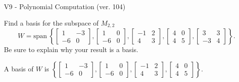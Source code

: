 \begin{exercise}
  \begin{exerciseTitle}V9 - Polynomial Computation (ver. 104)\end{exerciseTitle}
  \begin{exerciseStatement}
    Find a basis for the subspace of \(M_{2,2}\) 
\[W=\mathrm{span}\ \left\{\left[\begin{array}{cc}
1 & -3 \\
-6 & 0
\end{array}\right] , \left[\begin{array}{cc}
1 & 0 \\
-6 & 0
\end{array}\right] , \left[\begin{array}{cc}
-1 & 2 \\
4 & 3
\end{array}\right] , \left[\begin{array}{cc}
4 & 0 \\
4 & 5
\end{array}\right] , \left[\begin{array}{cc}
3 & 3 \\
-3 & 4
\end{array}\right]\right\}.\]
 Be sure to explain why your result is a basis.


  \end{exerciseStatement}
  \begin{exerciseAnswer}
   A basis of \(W\) is  \(\left\{\left[\begin{array}{cc}
1 & -3 \\
-6 & 0
\end{array}\right] , \left[\begin{array}{cc}
1 & 0 \\
-6 & 0
\end{array}\right] , \left[\begin{array}{cc}
-1 & 2 \\
4 & 3
\end{array}\right] , \left[\begin{array}{cc}
4 & 0 \\
4 & 5
\end{array}\right]\right\}\).
  


  \end{exerciseAnswer}
\end{exercise}